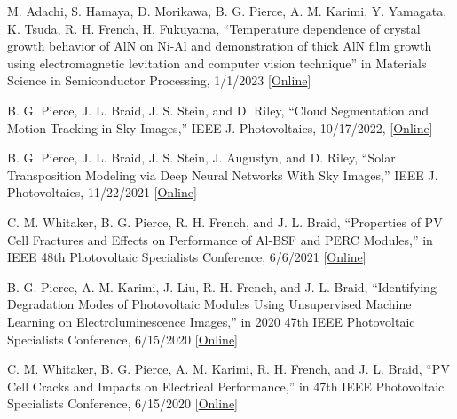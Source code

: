 \documentclass[10pt]{article}
\begin{document}
		

	{\begin{newitemize}
    
     \item{M. Adachi, S. Hamaya, D. Morikawa, { B. G. Pierce}, A. M. Karimi, Y. Yamagata, K. Tsuda, R. H. French,  H. Fukuyama, ``Temperature dependence of crystal growth behavior of AlN on Ni-Al and demonstration of thick AlN film growth using electromagnetic levitation and computer vision technique'' in Materials Science in Semiconductor Processing, 1/1/2023 [\href{https://www.sciencedirect.com/science/article/pii/S136980012200693X}{Online}] }
    
     \item{{ B. G. Pierce}, J. L. Braid, J. S. Stein, and D. Riley, ``Cloud Segmentation and Motion Tracking in Sky Images,” IEEE J. Photovoltaics, 10/17/2022, [\href{https://ieeexplore.ieee.org/abstract/document/9950360/}{Online}] }
   
    \item{{ B. G. Pierce}, J. L. Braid, J. S. Stein, J. Augustyn, and D. Riley, ``Solar Transposition Modeling via Deep Neural Networks With Sky Images,” IEEE J. Photovoltaics, 11/22/2021 [\href{https://ieeexplore.ieee.org/abstract/document/9623380}{Online}] }
    
     \item{C. M. Whitaker, { B. G. Pierce}, R. H. French, and J. L. Braid, ``Properties of PV Cell Fractures and Effects on Performance of Al-BSF and PERC Modules,” in IEEE 48th Photovoltaic Specialists Conference, 6/6/2021 [\href{https://ieeexplore.ieee.org/abstract/document/9519030}{Online}] }
    
    \item {{ B. G. Pierce}, A. M. Karimi, J. Liu, R. H. French, and J. L. Braid, ``Identifying Degradation Modes of Photovoltaic Modules Using Unsupervised Machine Learning on Electroluminescence Images,'' in 2020 47th IEEE Photovoltaic Specialists Conference, 6/15/2020 [\href{https://ieeexplore.ieee.org/abstract/document/9301021}{Online}] }
    
    
    \item{C. M. Whitaker, { B. G. Pierce}, A. M. Karimi, R. H. French, and J. L. Braid, ``PV Cell Cracks and Impacts on Electrical Performance,'' in 47th IEEE Photovoltaic Specialists Conference, 6/15/2020 [\href{https://ieeexplore.ieee.org/abstract/document/9300374}{Online}] } 
    

\end{newitemize}}
\end{document}

